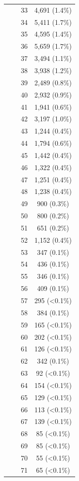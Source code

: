 \documentclass[
  letterpaper,
  DIV=11,
  numbers=noendperiod]{scrartcl}
\begin{document}
\begin{enumerate}
\begin{table}
\begin{tabular*}{\linewidth}{@{\extracolsep{\fill}}lc}
      33 & 4,691 (1.4\%) \\ 
      34 & 5,411 (1.7\%) \\ 
      35 & 4,595 (1.4\%) \\ 
      36 & 5,659 (1.7\%) \\ 
      37 & 3,494 (1.1\%) \\ 
      38 & 3,938 (1.2\%) \\ 
      39 & 2,489 (0.8\%) \\ 
      40 & 2,932 (0.9\%) \\ 
      41 & 1,941 (0.6\%) \\ 
      42 & 3,197 (1.0\%) \\ 
      43 & 1,244 (0.4\%) \\ 
      44 & 1,794 (0.6\%) \\ 
      45 & 1,442 (0.4\%) \\ 
      46 & 1,322 (0.4\%) \\ 
      47 & 1,251 (0.4\%) \\ 
      48 & 1,238 (0.4\%) \\ 
      49 & 900 (0.3\%) \\ 
      50 & 800 (0.2\%) \\ 
      51 & 651 (0.2\%) \\ 
      52 & 1,152 (0.4\%) \\ 
      53 & 347 (0.1\%) \\ 
      54 & 436 (0.1\%) \\ 
      55 & 346 (0.1\%) \\ 
      56 & 409 (0.1\%) \\ 
      57 & 295 (<0.1\%) \\ 
      58 & 384 (0.1\%) \\ 
      59 & 165 (<0.1\%) \\ 
      60 & 202 (<0.1\%) \\ 
      61 & 126 (<0.1\%) \\ 
      62 & 342 (0.1\%) \\ 
      63 & 92 (<0.1\%) \\ 
      64 & 154 (<0.1\%) \\ 
      65 & 129 (<0.1\%) \\ 
      66 & 113 (<0.1\%) \\ 
      67 & 139 (<0.1\%) \\ 
      68 & 85 (<0.1\%) \\ 
      69 & 85 (<0.1\%) \\ 
      70 & 55 (<0.1\%) \\ 
      71 & 65 (<0.1\%) \\ 

\end{tabular*}
\end{table}
\end{enumerate}
\end{document}
